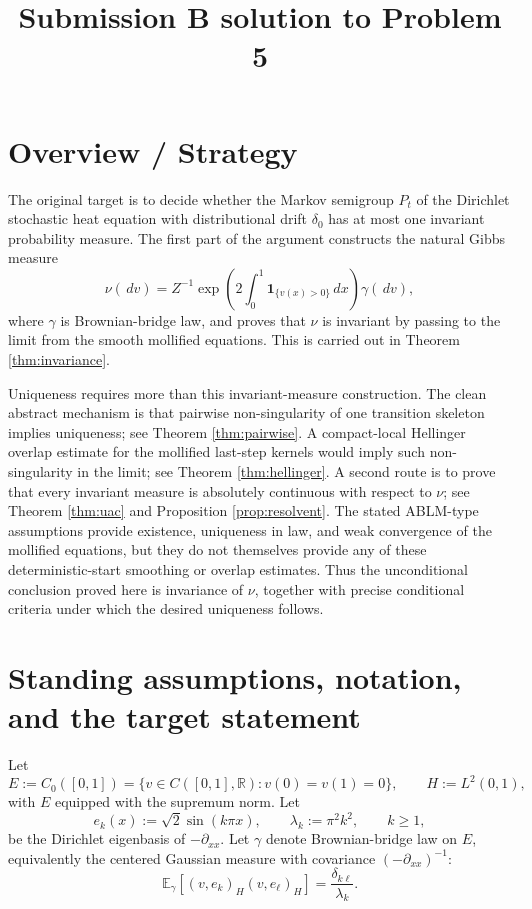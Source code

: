 \documentclass[12pt]{article}
\newcommand{\R}{\mathbb R}
\newcommand{\E}{\mathbb E}
\newcommand{\1}{\mathbf 1}
\newcommand{\dd}{\,d}
\theoremstyle{plain}
\theoremstyle{definition}
\theoremstyle{remark}
\numberwithin{equation}{section}
\begin{document}
\title{Submission B solution to Problem 5}
\date{}
\maketitle

\section*{Overview / Strategy}

The original target is to decide whether the Markov semigroup \(P_t\) of the
Dirichlet stochastic heat equation with distributional drift \(\delta_0\) has
at most one invariant probability measure.  The first part of the argument
constructs the natural Gibbs measure
\[
\nu(\dd v)=Z^{-1}\exp\!\left(2\int_0^1\1_{\{v(x)>0\}}\dd x\right)\gamma(\dd v),
\]
where \(\gamma\) is Brownian-bridge law, and proves that \(\nu\) is invariant by
passing to the limit from the smooth mollified equations.  This is carried out
in Theorem \ref{thm:invariance}.

Uniqueness requires more than this invariant-measure construction.  The clean
abstract mechanism is that pairwise non-singularity of one transition skeleton
implies uniqueness; see Theorem \ref{thm:pairwise}.  A compact-local Hellinger
overlap estimate for the mollified last-step kernels would imply such
non-singularity in the limit; see Theorem \ref{thm:hellinger}.  A second route is
to prove that every invariant measure is absolutely continuous with respect to
\(\nu\); see Theorem \ref{thm:uac} and Proposition \ref{prop:resolvent}.  The
stated ABLM-type assumptions provide existence, uniqueness in law, and weak
convergence of the mollified equations, but they do not themselves provide any
of these deterministic-start smoothing or overlap estimates.  Thus the
unconditional conclusion proved here is invariance of \(\nu\), together with
precise conditional criteria under which the desired uniqueness follows.

\section{Standing assumptions, notation, and the target statement}

Let
\[
E:=C_0([0,1])
=\{v\in C([0,1],\R):v(0)=v(1)=0\},
\qquad H:=L^2(0,1),
\]
with \(E\) equipped with the supremum norm.  Let
\[
e_k(x):=\sqrt2\sin(k\pi x),\qquad \lambda_k:=\pi^2k^2,\qquad k\ge1,
\]
be the Dirichlet eigenbasis of \(-\partial_{xx}\).  Let \(\gamma\) denote
Brownian-bridge law on \(E\), equivalently the centered Gaussian measure with
covariance \((-\partial_{xx})^{-1}\):
\[
\E_\gamma[(v,e_k)_H(v,e_\ell)_H]=\frac{\delta_{k\ell}}{\lambda_k}.
\]
\end{document}
